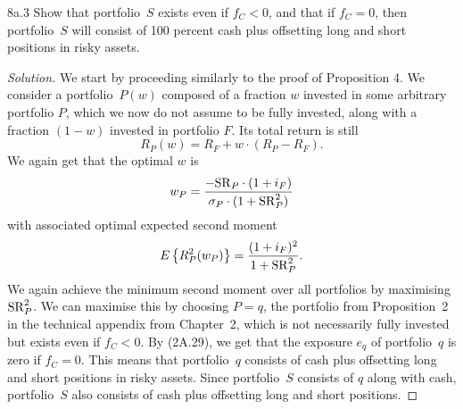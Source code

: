 \begin{problem}{8a.3}
Show that portfolio~$S$ exists even if $f_{C} < 0$, and that if $f_{C} = 0$, then portfolio~$S$ will consist of 100 percent cash plus offsetting long and short positions in risky assets.
\end{problem}
\begin{proof}[Solution]
We start by proceeding similarly to the proof of Proposition 4. We consider a portfolio~$P(w)$ composed of a fraction $w$ invested in some arbitrary portfolio $P$, which we now do not assume to be fully invested, along with a fraction $(1 - w)$ invested in portfolio $F$. Its total return is still \[R_{P}(w) = R_{F} + w \cdot (R_{P} - R_{F}).\] We again get that the optimal $w$ is \[w_{P} = \frac{-\mathrm{SR}_{P} \cdot (1 + i_{F})}{\sigma_{P}\cdot (1 + \mathrm{SR}_{P}^{2})}\] with associated optimal expected second moment \[E\left\{R_{P}^{2}(w_{P})\right\} = \frac{(1 + i_{F})^{2}}{1 + \mathrm{SR}_{P}^{2}}.\] We again achieve the minimum second moment over all portfolios by maximising $\mathrm{SR}_{P}^{2}$. We can maximise this by choosing $P = q$, the portfolio from Proposition~2 in the technical appendix from Chapter~2, which is not necessarily fully invested but exists even if $f_{C} < 0$. By (2A.29), we get that the exposure $e_{q}$ of portfolio~$q$ is zero if $f_{C} = 0$. This means that portfolio~$q$ consists of cash plus offsetting long and short positions in risky assets. Since portfolio~$S$ consists of $q$ along with cash, portfolio~$S$ also consists of cash plus offsetting long and short positions.
\end{proof}


